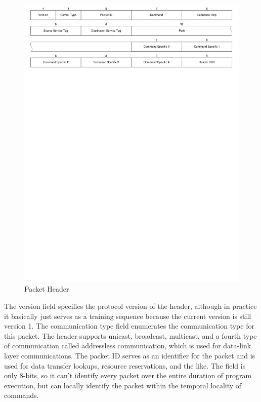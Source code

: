 \begin{landscape}
	\begin{figure}[p]
		\begin{centering}
			\includegraphics{Protocol/Figures/protocol-packet_header.pdf}
			\caption{Packet Header}
			\label{fig:protocol:packet_header}
		\end{centering}
	\end{figure}
\end{landscape}

The version field specifies the protocol version of the header, although in practice it basically just serves as a training sequence because the current version is still version 1. The communication type field enumerates the communication type for this packet. The header supports unicast, broadcast, multicast, and a fourth type of communication called addressless communication, which is used for data-link layer communications. The packet ID serves as an identifier for the packet and is used for data transfer lookups, resource reservations, and the like. The field is only 8-bits, so it can't identify every packet over the entire duration of program execution, but can locally identify the packet within the temporal locality of commands.

